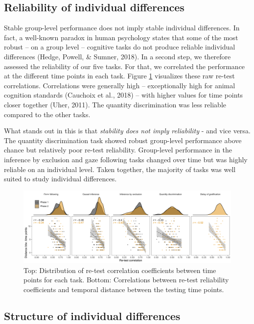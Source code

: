 \documentclass[
  man,floatsintext]{apa6}
\begin{document}
\hypertarget{reliability-of-individual-differences}{%
\subsection{Reliability of individual differences}\label{reliability-of-individual-differences}}

Stable group-level performance does not imply stable individual differences. In fact, a well-known paradox in human psychology states that some of the most robust -- on a group level -- cognitive tasks do not produce reliable individual differences (Hedge, Powell, \& Sumner, 2018). In a second step, we therefore assessed the reliability of our five tasks. For that, we correlated the performance at the different time points in each task. Figure \ref{fig:relplot} visualizes these raw re-test correlations. Correlations were generally high -- exceptionally high for animal cognition standards (Cauchoix et al., 2018) -- with higher values for time points closer together (Uher, 2011). The quantity discrimination was less reliable compared to the other tasks.

What stands out in this is that \emph{stability does not imply reliability} - and vice versa. The quantity discrimination task showed robust group-level performance above chance but relatively poor re-test reliability. Group-level performance in the inference by exclusion and gaze following tasks changed over time but was highly reliable on an individual level. Taken together, the majority of tasks was well suited to study individual differences.

\begin{figure}
\includegraphics[width=1\linewidth]{./figures/reliability} \caption{Top: Distribution of re-test correlation coefficients between time points for each task. Bottom: Correlations between re-test reliability coefficients and temporal distance between the testing time points.}\label{fig:relplot}
\end{figure}

\hypertarget{structure-of-individual-differences}{%
\subsection{Structure of individual differences}\label{structure-of-individual-differences}}
\end{document}
